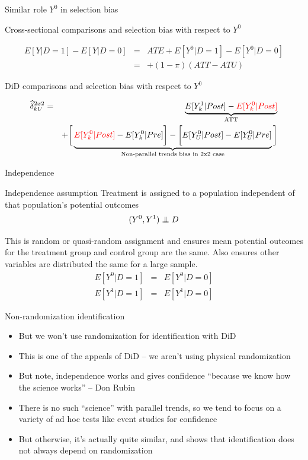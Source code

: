 \documentclass{beamer}
\newcommand\independent{\protect\mathpalette{\protect\independenT}{\perp}}
\def\independenT#1#2{\mathrel{\rlap{$#1#2$}\mkern2mu{#1#2}}}
\begin{document}
\begin{frame}{Similar role $Y^0$ in selection bias}

Cross-sectional comparisons and selection bias with respect to $Y^0$

\begin{eqnarray*}
E[Y|D=1] - E[Y|D=0] &=& ATE + E[Y^0|D=1] - E[Y^0|D=0] \\
&=& + (1- \pi)(ATT-ATU)
\end{eqnarray*}

DiD comparisons and selection bias with respect to $Y^0$

\begin{eqnarray*}
\widehat{\delta}^{2x2}_{kU} &=& \underbrace{E[Y^1_k | Post] - \textcolor{red}{E[Y^0_k | Post]}}_{\mathclap{\text{ATT}}} \\
&& + \bigg [  \underbrace{\textcolor{red}{E[Y^0_k | Post]} - E[Y^0_k | Pre] \bigg ] - \bigg [ E[Y^0_U | Post] - E[Y_U^0 | Pre] }_{\mathclap{\text{Non-parallel trends bias in 2x2 case}}} \bigg ]
\end{eqnarray*}

\end{frame}


\begin{frame}{Independence}
	

	\begin{block}{Independence assumption}
	Treatment is assigned to a population independent of that population's potential outcomes  $$(Y^0,Y^1)\independent{D}$$
	\end{block}
This is random or quasi-random assignment and ensures mean potential outcomes for the treatment group and control group are the same.  Also ensures other variables are distributed the same for a large sample.
		\begin{eqnarray*}
			E[Y^0|D=1] &=& E[Y^0 | D=0] \\
			E[Y^1|D=1] &=& E[Y^1 | D=0] 
		\end{eqnarray*}
\end{frame}

\begin{frame}{Non-randomization identification}

\begin{itemize}
\item But we won't use randomization for identification with DiD
\item This is one of the appeals of DiD -- we aren't using physical randomization
\item But note, independence works and gives confidence ``because we know how the science works'' -- Don Rubin
\item There is no such ``science'' with parallel trends, so we tend to focus on a variety of ad hoc tests like event studies for confidence
\item But otherwise, it's actually quite similar, and shows that identification does not always depend on randomization
\end{itemize}

\end{frame}
\end{document}
